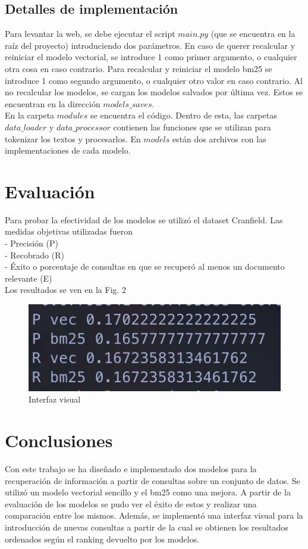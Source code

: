 \documentclass[runningheads,a4paper]{llncs}
\begin{document}
\subsection{Detalles de implementación} 
Para levantar la web, se debe ejecutar el script $main.py$ (que se encuentra en la raíz del proyecto) introduciendo dos parámetros. En caso de querer recalcular y reiniciar el modelo vectorial, se introduce 1 como primer argumento, o cualquier otra cosa en caso contrario. Para recalcular y reiniciar el modelo bm25 se introduce 1 como segundo argumento, o cualquier otro valor en caso contrario. Al no recalcular los modelos, se cargan los modelos salvados por última vez. Estos se encuentran en la dirección $models\_saves$.\\

En la carpeta $modules$ se encuentra el código. Dentro de esta, las carpetas $data\_loader$ y $data\_processor$ contienen las funciones que se utilizan para tokenizar los textos y procesarlos. En $models$ están dos archivos con las implementaciones de cada modelo.


\section{Evaluación}
Para probar la efectividad de los modelos se utilizó el dataset Cranfield. Las medidas objetivas utilizadas fueron\\
- Precisión (P)\\
- Recobrado (R)\\
- Éxito o porcentaje de consultas en que se recuperó al menos un documento relevante (E)\\

Los resultados se ven en la Fig. 2

\begin{figure}
	\centering
	\includegraphics[width=0.7\linewidth]{./eval.jpg}
	\caption{Interfaz visual}
	\label{fig:2}
\end{figure}




\section{Conclusiones}
Con este trabajo se ha diseñado e implementado dos modelos para la recuperación de información a partir de consultas sobre un conjunto de datos. Se utilizó un modelo vectorial sencillo y el bm25 como una mejora. A partir de la evaluación de los modelos se pudo ver el éxito de estos y realizar una comparación entre los mismos. Además, se implementó una interfaz visual para la introducción de nuevas consultas a partir de la cual se obtienen los resultados ordenados según el ranking devuelto por los modelos.
\end{document}
